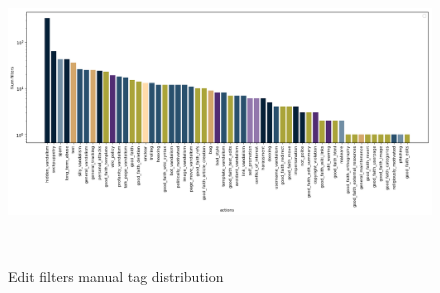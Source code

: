 \begin{figure}
\centering
  \includegraphics[width=0.9\columnwidth]{pics/manual-tags-distribution.png}
  \caption{Edit filters manual tag distribution}~\label{fig:manual-tags}
\end{figure}

